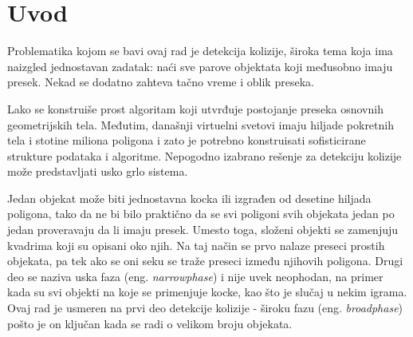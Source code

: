 \documentclass[12pt,oneside]{memoir}
\begin{document}
\frontmatter

\naslovna
\komisija
\apstrakt
\tableofcontents*

\mainmatter

\chapter{Uvod}
\label{sec:uvod}

Problematika kojom se bavi ovaj rad je detekcija kolizije, široka tema koja ima naizgled jednostavan zadatak:
naći sve parove objektata koji međusobno imaju presek. Nekad se dodatno zahteva tačno vreme i oblik preseka. 

Lako se konstruiše prost algoritam koji utvrđuje postojanje preseka osnovnih geometrijskih tela.
Međutim, današnji virtuelni svetovi imaju hiljade pokretnih tela i stotine miliona poligona i 
zato je potrebno konstruisati sofisticirane strukture podataka i algoritme. 
Nepogodno izabrano rešenje za detekciju kolizije može predstavljati usko grlo sistema.

Jedan objekat može biti jednostavna kocka ili izgrađen od desetine hiljada poligona, tako da ne bi bilo praktično 
da se svi poligoni svih objekata jedan po jedan proveravaju da li imaju presek.
Umesto toga, složeni objekti se zamenjuju kvadrima koji su opisani oko njih.
Na taj način se prvo nalaze preseci prostih objekata, pa tek ako se oni seku se traže preseci između njihovih 
poligona. Drugi deo se naziva uska faza (eng. {\em narrowphase}) i nije uvek neophodan, na primer kada su svi objekti na koje se primenjuje 
kocke, kao što je slučaj u nekim igrama.  Ovaj rad je usmeren na prvi deo detekcije kolizije - široku fazu (eng. {\em broadphase}) pošto je on 
ključan kada se radi o velikom broju objekata.
\end{document}
